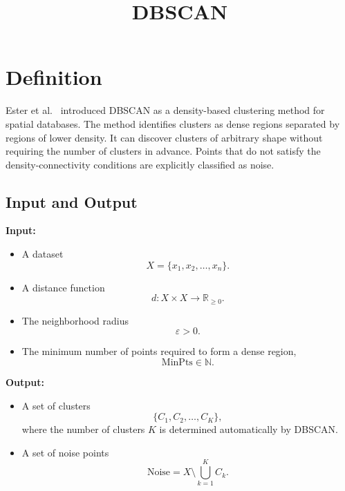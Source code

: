 \documentclass[a4paper]{article}
\title{DBSCAN}
\date{}
\begin{document}
   \maketitle

   \section{Definition}

      Ester et al.~\cite{ester-1996-a-density-based-algorithm-for-discovering-clusters-in-large-spatial-databases-with-noise} introduced DBSCAN as a density-based clustering method for spatial databases. The method identifies clusters as dense regions separated by regions of lower density. It can discover clusters of arbitrary shape without requiring the number of clusters in  advance. Points that do not satisfy the density-connectivity conditions are explicitly classified as noise.

      \subsection{Input and Output}

         \textbf{Input:}

         \begin{itemize}
            \item A dataset
            \[
            X = \{x_1, x_2, \ldots, x_n\}.
            \]
            \item A distance function
            \[
            d : X \times X \rightarrow \mathbb{R}_{\geq 0}.
            \]
            \item The neighborhood radius
            \[
            \varepsilon > 0.
            \]
            \item The minimum number of points required to form a dense region,
            \[
            \mathrm{MinPts} \in \mathbb{N}.
            \]
         \end{itemize}

         \textbf{Output:}

         \begin{itemize}
            \item A set of clusters
            \[
            \{C_1, C_2, \ldots, C_K\},
            \]
            where the number of clusters $K$ is determined automatically by DBSCAN.
            \item A set of noise points
            \[
            \mathrm{Noise}
            =
            X \setminus \bigcup_{k=1}^{K} C_k.
            \]
         \end{itemize}
\end{document}
